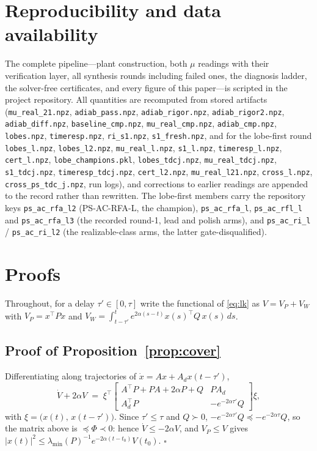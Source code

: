 \documentclass[preprint,12pt]{elsarticle}
\begin{document}
\section*{Reproducibility and data availability}

{\sloppy
The complete pipeline---plant construction, both $\mu$ readings with
their verification layer, all synthesis rounds including failed ones,
the diagnosis ladder, the solver-free certificates, and every figure
of this paper---is scripted in the project repository.  All quantities
are recomputed from stored artifacts
(\texttt{mu\_real\_21.npz}, \texttt{adiab\_pass.npz},
\texttt{adiab\_rigor.npz}, \texttt{adiab\_rigor2.npz},
\texttt{adiab\_diff.npz}, \texttt{baseline\_cmp.npz},
\texttt{mu\_real\_cmp.npz}, \texttt{adiab\_cmp.npz},
\texttt{lobes.npz}, \texttt{timeresp.npz}, \texttt{ri\_s1.npz},
\texttt{s1\_fresh.npz}, and for the lobe-first round
\texttt{lobes\_l.npz}, \texttt{lobes\_l2.npz}, \texttt{mu\_real\_l.npz},
\texttt{s1\_l.npz}, \texttt{timeresp\_l.npz}, \texttt{cert\_l.npz},
\texttt{lobe\_champions.pkl}, \texttt{lobes\_tdcj.npz},
\texttt{mu\_real\_tdcj.npz}, \texttt{s1\_tdcj.npz},
\texttt{timeresp\_tdcj.npz}, \texttt{cert\_l2.npz},
\texttt{mu\_real\_l21.npz}, \texttt{cross\_l.npz},
\texttt{cross\_ps\_tdc\_j.npz}, run logs), and
corrections to earlier
readings are appended to the record rather than rewritten.  The
lobe-first members carry the repository keys \texttt{ps\_ac\_rfa\_l2}
(PS-AC-RFA-L, the champion), \texttt{ps\_ac\_rfa\_l},
\texttt{ps\_ac\_rfl\_l} and \texttt{ps\_ac\_rfa\_l3} (the recorded
round-1, lead and polish arms), and \texttt{ps\_ac\_ri\_l} /
\texttt{ps\_ac\_ri\_l2} (the realizable-class arms, the latter
gate-disqualified).\par}

\clearpage
\appendix
\section{Proofs}
\label{app:proofs}

Throughout, for a delay $\tau' \in [0, \tau]$ write the functional of
\eqref{eq:lk} as $V = V_P + V_W$ with $V_P = x^{\!\top} P x$ and
$V_W = \int_{t-\tau'}^{t} e^{2\alpha(s-t)} x(s)^{\!\top} Q\, x(s)\,ds$.

\subsection{Proof of Proposition~\ref{prop:cover}}

Differentiating along trajectories of
$\dot x = A x + A_d x(t-\tau')$,
\[
\dot V + 2\alpha V \;=\;
\xi^{\!\top}
\begin{bmatrix}
A^{\!\top}P + PA + 2\alpha P + Q & P A_d \\
A_d^{\!\top} P & -e^{-2\alpha \tau'} Q
\end{bmatrix}
\xi,
\]
with $\xi = \big(x(t),\, x(t-\tau')\big)$.
Since $\tau' \le \tau$ and $Q \succ 0$,
$-e^{-2\alpha\tau'} Q \preceq -e^{-2\alpha\tau} Q$, so the matrix
above is $\preceq \Phi \prec 0$: hence $\dot V \le -2\alpha V$, and
$V_P \le V$ gives
$|x(t)|^2 \le \lambda_{\min}(P)^{-1} e^{-2\alpha (t-t_0)} V(t_0)$.
\hfill$\square$
\end{document}
